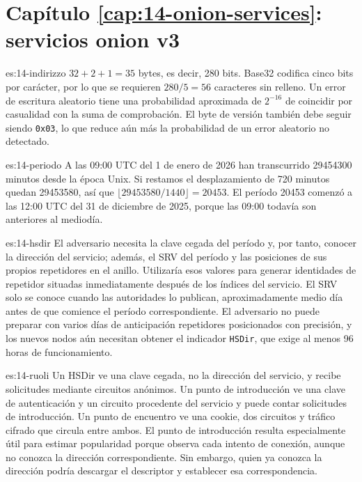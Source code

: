 \section*{Capítulo \ref{cap:14-onion-services}: servicios onion v3}

\begin{soluzione}{es:14-indirizzo}
$32+2+1=35$ bytes, es decir, 280 bits. Base32 codifica cinco bits por carácter, por lo que se requieren $280/5=56$ caracteres sin relleno. Un error de escritura aleatorio tiene una probabilidad aproximada de $2^{-16}$ de coincidir por casualidad con la suma de comprobación. El byte de versión también debe seguir siendo \texttt{0x03}, lo que reduce aún más la probabilidad de un error aleatorio no detectado.
\end{soluzione}

\begin{soluzione}{es:14-periodo}
A las 09:00 UTC del 1 de enero de 2026 han transcurrido \num{29454300} minutos desde la época Unix. Si restamos el desplazamiento de 720 minutos quedan \num{29453580}, así que $\lfloor29453580/1440\rfloor=20453$. El período \num{20453} comenzó a las 12:00 UTC del 31 de diciembre de 2025, porque las 09:00 todavía son anteriores al mediodía.
\end{soluzione}

\begin{soluzione}{es:14-hsdir}
El adversario necesita la clave cegada del período y, por tanto, conocer la dirección del servicio; además, el SRV del período y las posiciones de sus propios repetidores en el anillo. Utilizaría esos valores para generar identidades de repetidor situadas inmediatamente después de los índices del servicio. El SRV solo se conoce cuando las autoridades lo publican, aproximadamente medio día antes de que comience el período correspondiente. El adversario no puede preparar con varios días de anticipación repetidores posicionados con precisión, y los nuevos nodos aún necesitan obtener el indicador \texttt{HSDir}, que exige al menos 96 horas de funcionamiento.
\end{soluzione}

\begin{soluzione}{es:14-ruoli}
Un HSDir ve una clave cegada, no la dirección del servicio, y recibe solicitudes mediante circuitos anónimos. Un punto de introducción ve una clave de autenticación y un circuito procedente del servicio y puede contar solicitudes de introducción. Un punto de encuentro ve una cookie, dos circuitos y tráfico cifrado que circula entre ambos. El punto de introducción resulta especialmente útil para estimar popularidad porque observa cada intento de conexión, aunque no conozca la dirección correspondiente. Sin embargo, quien ya conozca la dirección podría descargar el descriptor y establecer esa correspondencia.
\end{soluzione}

